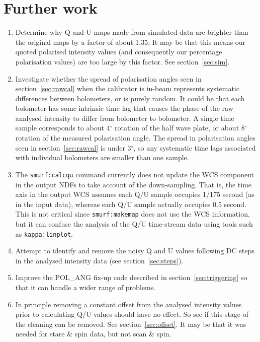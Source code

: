 \documentclass[twoside,11pt]{starlink}
\begin{document}
\section{Further work}
\begin{enumerate}

\item Determine why Q and U maps made from simulated data are brighter
than the original maps by a factor of about 1.35. It may be that this
means our quoted polarised intensity values (and consequently our
percentage polarisation values) are too large by this factor.
See section~\ref{sec:sim}.

\item Investigate whether the spread of polarisation angles seen in
section~\ref{sec:rawcal} when the calibrator is in-beam represents
systematic differences between bolometers, or is purely random. It could
be that each bolometer has some intrinsic time lag that causes the phase
of the raw analysed intensity to differ from bolometer to bolometer. A
single time sample corresponds to about 4$^\circ$ rotation of the half
wave plate, or about 8$^\circ$ rotation of the measured polarisation
angle. The spread in polarisation angles seen in section~\ref{sec:rawcal}
is under 3$^\circ$, so any systematic time lags associated with
individual bolometers are smaller than one sample.

\item The \texttt{smurf:calcqu} command currently does not update the WCS
component in the output NDFs to take account of the down-sampling. That is,
the time axis in the output WCS assumes each Q/U sample occupies 1/175
second (as in the input data), whereas each Q/U sample actually occupies 0.5
second. This is not critical since \texttt{smurf:makemap} does not use the
WCS information, but it can confuse the analysis of the Q/U time-stream data
using tools such as \texttt{kappa:linplot}.

\item Attempt to identify and remove the noisy Q and U values following
DC steps in the analysed intensity data (see section~\ref{sec:steps}).

\item Improve the POL\_ANG fix-up code described in
section~\ref{sec:triggering} so that it can handle a wider range of
problems.

\item In principle removing a constant offset from the analysed intensity
values prior to calculating Q/U values should have no effect. So see if
this stage of the cleaning can be removed. See section~\ref{sec:offset}.
It may be that it was needed for stare \& spin data, but not scan \& spin.


\end{enumerate}
\end{document}

